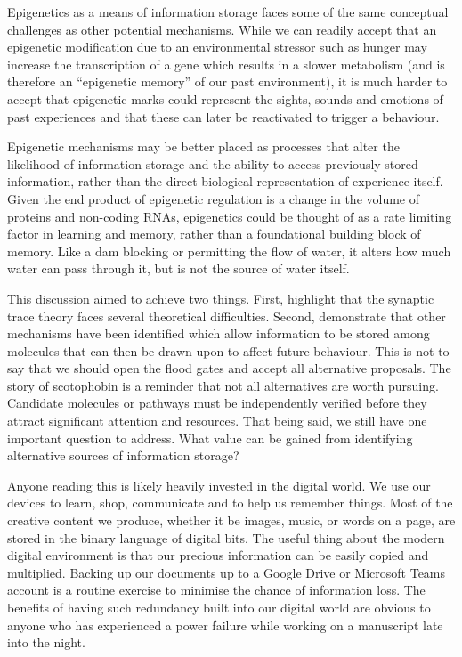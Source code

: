\documentclass[
  jou,
  floatsintext,
  longtable,
  nolmodern,
  notxfonts,
  notimes,
  donotrepeattitle,
  colorlinks=true,linkcolor=blue,citecolor=blue,urlcolor=blue]{apa7}
\begin{document}
Epigenetics as a means of information storage faces some of the same
conceptual challenges as other potential mechanisms. While we can
readily accept that an epigenetic modification due to an environmental
stressor such as hunger may increase the transcription of a gene which
results in a slower metabolism (and is therefore an ``epigenetic
memory'' of our past environment), it is much harder to accept that
epigenetic marks could represent the sights, sounds and emotions of past
experiences and that these can later be reactivated to trigger a
behaviour.

Epigenetic mechanisms may be better placed as processes that alter the
likelihood of information storage and the ability to access previously
stored information, rather than the direct biological representation of
experience itself. Given the end product of epigenetic regulation is a
change in the volume of proteins and non-coding RNAs, epigenetics could
be thought of as a rate limiting factor in learning and memory, rather
than a foundational building block of memory. Like a dam blocking or
permitting the flow of water, it alters how much water can pass through
it, but is not the source of water itself.

This discussion aimed to achieve two things. First, highlight that the
synaptic trace theory faces several theoretical difficulties. Second,
demonstrate that other mechanisms have been identified which allow
information to be stored among molecules that can then be drawn upon to
affect future behaviour. This is not to say that we should open the
flood gates and accept all alternative proposals. The story of
scotophobin is a reminder that not all alternatives are worth pursuing.
Candidate molecules or pathways must be independently verified before
they attract significant attention and resources. That being said, we
still have one important question to address. What value can be gained
from identifying alternative sources of information storage?

Anyone reading this is likely heavily invested in the digital world. We
use our devices to learn, shop, communicate and to help us remember
things. Most of the creative content we produce, whether it be images,
music, or words on a page, are stored in the binary language of digital
bits. The useful thing about the modern digital environment is that our
precious information can be easily copied and multiplied. Backing up our
documents up to a Google Drive or Microsoft Teams account is a routine
exercise to minimise the chance of information loss. The benefits of
having such redundancy built into our digital world are obvious to
anyone who has experienced a power failure while working on a manuscript
late into the night.
\end{document}
